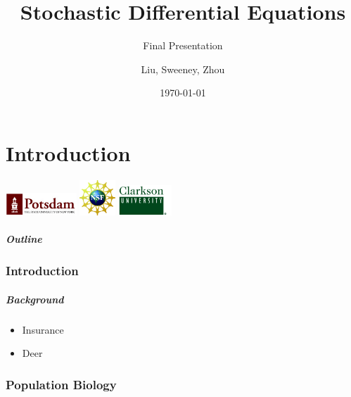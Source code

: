 \documentclass{beamer}   %
\begin{document}
\part{Introduction}


\title{Stochastic Differential Equations}
\subtitle{Final Presentation}

\author{Liu, Sweeney, Zhou}
\date{\today}

\begin{frame}[plain]
  \titlepage
  \begin{center}
  \includegraphics[width=0.2\textwidth]{SUNYPotsdam}
  \includegraphics[width=0.1\textwidth]{nsf_logobig}
  \includegraphics[width=0.15\textwidth]{clarksonGreen}
\end{center}
\end{frame}

\begin{frame}
  \frametitle{Outline}
\end{frame}


\section{Introduction}

\begin{frame}
    \frametitle{Background}
	\begin{itemize}
		\item Insurance
		\item Deer
	\end{itemize}

\end{frame}







\section{Population Biology}
\end{document}
